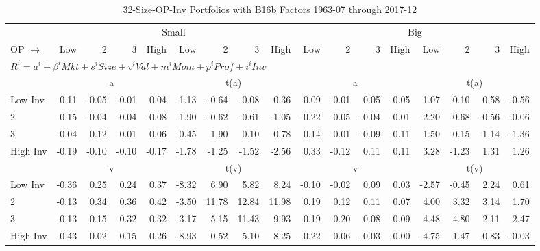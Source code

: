 
\begin{table}[!ht]
\footnotesize
\centering
\caption{32-Size-OP-Inv Portfolios with B16b Factors 1963-07 through 2017-12}
\begin{tabular}{lrrrrrrrrrrrrrrrr}
  \toprule
    & \multicolumn{8}{c}{Small} & \multicolumn{8}{c}{Big} \\
      \cmidrule(r){2-9} \cmidrule(r){10-17}
    OP $\rightarrow$ & Low & 2 & 3 & High & Low & 2 & 3 & High & Low & 2 & 3 & High & Low & 2 & 3 & High \\ 
  \midrule
  \multicolumn{17}{l}{$R^i=a^i+\beta^iMkt+s^iSize+v^iVal+m^iMom+p^iProf+i^iInv$} \\

  
    
      & \multicolumn{4}{c}{a} & \multicolumn{4}{c}{t(a)}
    
      & \multicolumn{4}{c}{a} & \multicolumn{4}{c}{t(a)}
    
    \\
      \cmidrule(r){2-5} \cmidrule(r){6-9} \cmidrule(r){10-13} \cmidrule(r){14-17}

    Low Inv   & 0.11  & -0.05  & -0.01  & 0.04  & 1.13  & -0.64  & -0.08  & 0.36  & 0.09  & -0.01  & 0.05  & -0.05  & 1.07  & -0.10  & 0.58  & -0.56  \\
           2  & 0.15  & -0.04  & -0.04  & -0.08  & 1.90  & -0.62  & -0.61  & -1.05  & -0.22  & -0.05  & -0.04  & -0.01  & -2.20  & -0.68  & -0.56  & -0.06  \\
           3  & -0.04  & 0.12  & 0.01  & 0.06  & -0.45  & 1.90  & 0.10  & 0.78  & 0.14  & -0.01  & -0.09  & -0.11  & 1.50  & -0.15  & -1.14  & -1.36  \\
    High Inv  & -0.19  & -0.10  & -0.10  & -0.17  & -1.78  & -1.25  & -1.52  & -2.56  & 0.33  & -0.12  & 0.11  & 0.11  & 3.28  & -1.23  & 1.31  & 1.26  \\

  
    
      & \multicolumn{4}{c}{v} & \multicolumn{4}{c}{t(v)}
    
      & \multicolumn{4}{c}{v} & \multicolumn{4}{c}{t(v)}
    
    \\
      \cmidrule(r){2-5} \cmidrule(r){6-9} \cmidrule(r){10-13} \cmidrule(r){14-17}

    Low Inv   & -0.36  & 0.25  & 0.24  & 0.37  & -8.32  & 6.90  & 5.82  & 8.24  & -0.10  & -0.02  & 0.09  & 0.03  & -2.57  & -0.45  & 2.24  & 0.61  \\
           2  & -0.13  & 0.34  & 0.36  & 0.42  & -3.50  & 11.78  & 12.84  & 11.98  & 0.19  & 0.12  & 0.11  & 0.07  & 4.00  & 3.32  & 3.14  & 1.70  \\
           3  & -0.13  & 0.15  & 0.32  & 0.32  & -3.17  & 5.15  & 11.43  & 9.93  & 0.19  & 0.20  & 0.08  & 0.09  & 4.48  & 4.80  & 2.11  & 2.47  \\
    High Inv  & -0.43  & 0.02  & 0.15  & 0.26  & -8.93  & 0.52  & 5.10  & 8.25  & -0.22  & 0.06  & -0.03  & -0.00  & -4.75  & 1.47  & -0.83  & -0.03  \\


\end{tabular}
\end{table}
